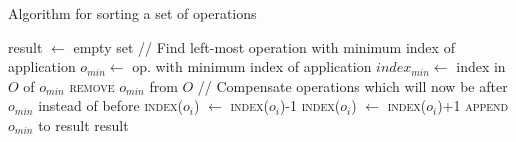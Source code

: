 \begin{algorithm}[!h]
  \caption{Algorithm for sorting a set of operations}
  \label{alg:opsort}
  \begin{algorithmic}
      \State result $\gets$ empty set
        \State // Find left-most operation with minimum index of application
        \State $o_{min} \gets$ op. with minimum index of application
        \State $index_{min} \gets$ index in $O$ of $o_{min}$
        \State \textsc{remove} $o_{min}$ from $O$
        \Statex
        \State // Compensate operations which will now be after $o_{min}$ instead of before
            \State \textsc{index}($o_i$) $\gets$ \textsc{index}($o_i$)-1
          \EndFor
            \State \textsc{index}($o_i$) $\gets$ \textsc{index}($o_i$)+1
          \EndFor
        \EndIf
        \State \textsc{append} $o_{min}$ to result
      \EndWhile
      \Statex
      \State \Return result
    \EndFunction
  \end{algorithmic}
\end{algorithm}

